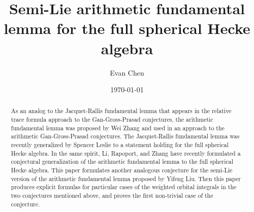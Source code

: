 \documentclass[11pt,colorlinks]{amsart}
\title[Semi-Lie Hecke AFL]
{Semi-Lie arithmetic fundamental lemma for the full spherical Hecke algebra}
\author{Evan Chen}
\date{\today}
\begin{document}
\maketitle

\begin{abstract}
  As an analog to the Jacquet-Rallis fundamental lemma that appears in the
  relative trace formula approach to the Gan-Gross-Prasad conjectures,
  the arithmetic fundamental lemma was proposed by Wei Zhang and used in an approach
  to the arithmetic Gan-Gross-Prasad conjectures.
  The Jacquet-Rallis fundamental lemma was recently generalized by Spencer Leslie
  to a statement holding for the full spherical Hecke algebra.
  In the same spirit, Li, Rapoport, and Zhang
  have recently formulated a conjectural generalization of the arithmetic
  fundamental lemma to the full spherical Hecke algebra.
  This paper formulates another analogous conjecture for the semi-Lie version
  of the arithmetic fundamental lemma proposed by Yifeng Liu.
  Then this paper produces explicit formulas for particular cases
  of the weighted orbital integrals in the two conjectures mentioned above,
  and proves the first non-trivial case of the conjecture.
\end{abstract}

\tableofcontents
\newpage




















\printbibliography[title=References]
\end{document}
